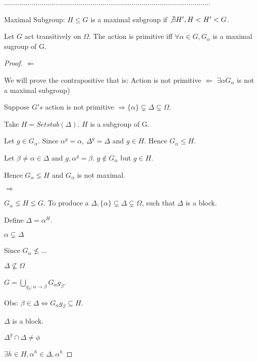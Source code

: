 .........................................................................................................

\begin{definition}{Maximal Subgroup:}
$H \leq G$ is a maximal subgroup if $\not \exists H',H < H' < G$.
\end{definition}

\begin{lemma}
Let $G$ act transitively on $\Omega$. The action is primitive iff $\forall \alpha \in G, G_\alpha$ is a maximal sugroup of G. 
\end{lemma}

\begin{proof}
$\Leftarrow$ 

We will prove the contrapositive that is: Action is not primitive $\Leftarrow$ $\exists \alpha G_\alpha$ is not a maximal subgroup)

Suppose $G's$ action is not primitive $\Rightarrow \{\alpha\} \subsetneq \Delta \subsetneq \Omega$. 

Take $H = Setstab(\Delta)$. $H$ is a subgroup of G.

Let $g \in G_\alpha$. Since $\alpha^g = \alpha$, $\Delta^g = \Delta$ and $g \in H$. Hence $G_\alpha \leq H$.

Let $\beta \neq \alpha \in \Delta$ and $g, \alpha^g = \beta$. $g \notin G_\alpha$ but $g \in H$. 

Hence $G_\alpha \lneq H$ and $G_\alpha$ is not maximal. 

$\Rightarrow$

$G_\alpha \lneq H \lneq G$. To produce a $\Delta,\{\alpha\} \subsetneq \Delta \subsetneq \Omega$, such that $\Delta$ is a block.

Define $\Delta = \alpha^H$. 

$\alpha \subsetneq \Delta$

Since $G_\alpha \not \leq $...

$\Delta \not \subseteq \Omega$

$G = \bigcup_{g_\beta :\alpha \rightarrow \beta } G_\alpha g_\beta $.

Obs: $\beta \in \Delta \Leftrightarrow G_\alpha g_\beta \subseteq H$.

$\Delta$ is a block.

$\Delta ^g \cap \Delta \neq \phi$

$\exists h \in H,\alpha ^h \in \Delta ,\alpha^h$

\end{proof}


